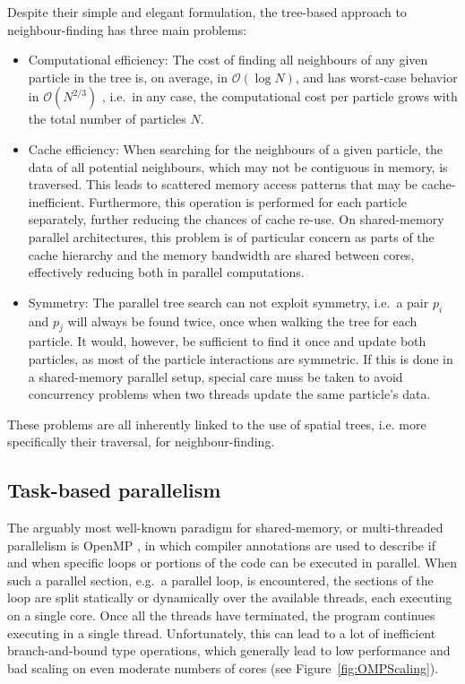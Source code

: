 \documentclass[final]{siamltex}
\newcommand{\oh}[1]
    {\mbox{$ {\mathcal O}( #1 ) $}}
\newcommand{\fig}[1]
    {Figure~\ref{fig:#1}}
\begin{document}
Despite their simple and elegant formulation, the tree-based
approach to neighbour-finding has three main problems:
\begin{itemize}
    \item Computational efficiency: The cost of finding all neighbours
        of any given particle in the tree is, on average, in \oh{\log N},
        and has worst-case behavior in \oh{N^{2/3}} \cite{ref:Lee1977},
        i.e.~in any case, the computational cost per particle grows with the
        total number of particles $N$.
    \item Cache efficiency: When searching for the neighbours of a
        given particle, the data of all potential neighbours, which may
        not be contiguous in memory, is traversed.
        This leads to scattered memory access patterns that may be
        cache-inefficient. Furthermore, this operation is performed for
        each particle separately, further reducing the chances
        of cache re-use.
        On shared-memory parallel architectures, this problem is of
        particular concern as parts of the cache hierarchy and the
        memory bandwidth are shared between cores, effectively
        reducing both in parallel computations.
    \item Symmetry: The parallel tree search can not exploit symmetry,
        i.e.~a pair $p_i$ and $p_j$ will always be found twice,
        once when walking the tree for each particle. It would, however,
        be sufficient to find it once and update both particles, as most
        of the particle interactions are symmetric.
        If this is done in a shared-memory parallel setup, special
        care muss be taken to avoid concurrency problems when
        two threads update the same particle's data.
\end{itemize}
    
These problems are all inherently linked to the use of
spatial trees, i.e. more specifically their traversal,
for neighbour-finding.


\subsection{Task-based parallelism}

The arguably most well-known paradigm for shared-memory,
or multi-threaded parallelism is OpenMP \cite{ref:Dagum1998},
in which compiler annotations are used to describe if and when
specific loops or portions of the code can be executed
in parallel.
When such a parallel section, e.g.~a parallel loop, is
encountered, the sections of the loop are split statically
or dynamically over the available threads, each executing
on a single core.
Once all the threads have terminated, the program continues
executing in a single thread.
Unfortunately, this can lead to a lot of inefficient
branch-and-bound
type operations, which generally lead to low performance and
bad scaling on even moderate numbers of cores (see \fig{OMPScaling}).
\end{document}
